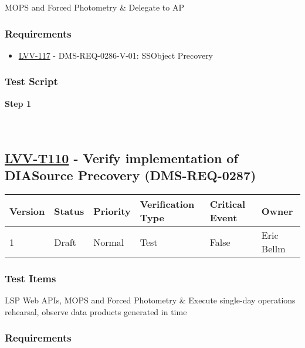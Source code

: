 MOPS and Forced Photometry \& Delegate to AP

\hypertarget{requirements-86}{%
\subsubsection{Requirements}\label{requirements-86}}

\begin{itemize}
\tightlist
\item
  \href{https://jira.lsstcorp.org/browse/LVV-117}{LVV-117} -
  DMS-REQ-0286-V-01: SSObject Precovery
\end{itemize}

\hypertarget{test-script-86}{%
\subsubsection{Test Script}\label{test-script-86}}

\textbf{Step 1}\\
~\\
~\\

\hypertarget{lvv-t110---verify-implementation-of-diasource-precovery-dms-req-0287}{%
\subsection{\texorpdfstring{\href{https://jira.lsstcorp.org/secure/Tests.jspa\#/testCase/LVV-T110}{LVV-T110}
- Verify implementation of DIASource Precovery
(DMS-REQ-0287)}{LVV-T110 - Verify implementation of DIASource Precovery (DMS-REQ-0287)}}\label{lvv-t110---verify-implementation-of-diasource-precovery-dms-req-0287}}

\begin{longtable}[]{@{}llllll@{}}
\toprule
Version & Status & Priority & Verification Type & Critical Event &
Owner\tabularnewline
\midrule
\endhead
1 & Draft & Normal & Test & False & Eric Bellm\tabularnewline
\bottomrule
\end{longtable}

\hypertarget{test-items-86}{%
\subsubsection{Test Items}\label{test-items-86}}

LSP Web APIs, MOPS and Forced Photometry \& Execute single-day
operations rehearsal, observe data products generated in time

\hypertarget{requirements-87}{%
\subsubsection{Requirements}\label{requirements-87}}

